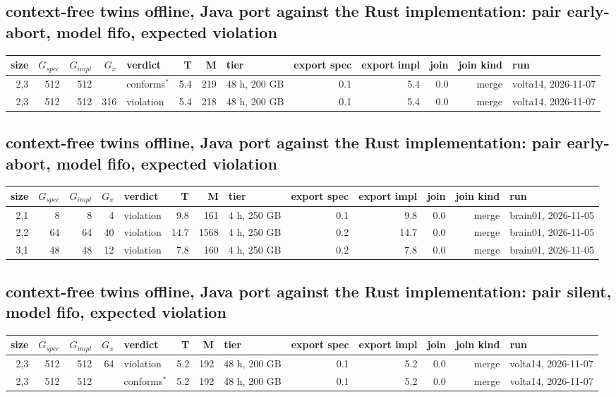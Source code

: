 \documentclass[10pt]{article}
\begin{document}
\subsection*{context-free twins offline, Java port against the Rust implementation: pair \textsf{early-abort}, model fifo, expected violation}
\begin{longtable}{@{}rrrrlrrlrrrrl@{}}
\toprule
size & $G_{\mathit{spec}}$ & $G_{\mathit{impl}}$ & $G_x$ & verdict & T & M & tier & export spec & export impl & join & join kind & run \\
\midrule
\endhead
\color{red} 2,3 & 512 & 512 &  & conforms$^{\ast}$ & 5.4 & 219 & 48 h, 200 GB & 0.1 & 5.4 & 0.0 & merge & volta14, 2026-11-07 \\
\color{red} 2,3 & 512 & 512 & 316 & violation & 5.4 & 218 & 48 h, 200 GB & 0.1 & 5.4 & 0.0 & merge & volta14, 2026-11-07 \\
\bottomrule
\end{longtable}
\subsection*{context-free twins offline, Java port against the Rust implementation: pair \textsf{early-abort}, model fifo, expected violation}
\begin{longtable}{@{}rrrrlrrlrrrrl@{}}
\toprule
size & $G_{\mathit{spec}}$ & $G_{\mathit{impl}}$ & $G_x$ & verdict & T & M & tier & export spec & export impl & join & join kind & run \\
\midrule
\endhead
\color{blue} 2,1 & 8 & 8 & 4 & violation & 9.8 & 161 & 4 h, 250 GB & 0.1 & 9.8 & 0.0 & merge & brain01, 2026-11-05 \\
\color{blue} 2,2 & 64 & 64 & 40 & violation & 14.7 & 1568 & 4 h, 250 GB & 0.2 & 14.7 & 0.0 & merge & brain01, 2026-11-05 \\
\color{blue} 3,1 & 48 & 48 & 12 & violation & 7.8 & 160 & 4 h, 250 GB & 0.2 & 7.8 & 0.0 & merge & brain01, 2026-11-05 \\
\bottomrule
\end{longtable}
\subsection*{context-free twins offline, Java port against the Rust implementation: pair \textsf{silent}, model fifo, expected violation}
\begin{longtable}{@{}rrrrlrrlrrrrl@{}}
\toprule
size & $G_{\mathit{spec}}$ & $G_{\mathit{impl}}$ & $G_x$ & verdict & T & M & tier & export spec & export impl & join & join kind & run \\
\midrule
\endhead
\color{red} 2,3 & 512 & 512 & 64 & violation & 5.2 & 192 & 48 h, 200 GB & 0.1 & 5.2 & 0.0 & merge & volta14, 2026-11-07 \\
\color{red} 2,3 & 512 & 512 &  & conforms$^{\ast}$ & 5.2 & 192 & 48 h, 200 GB & 0.1 & 5.2 & 0.0 & merge & volta14, 2026-11-07 \\
\bottomrule
\end{longtable}
\end{document}

